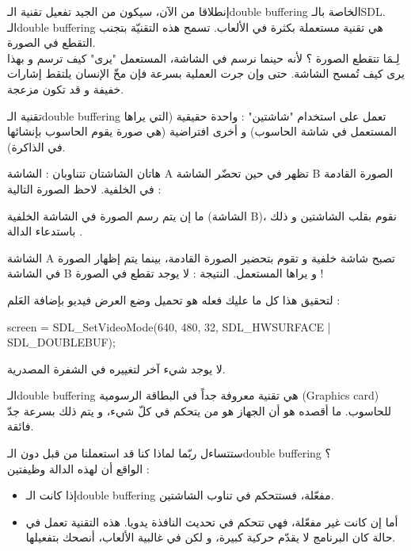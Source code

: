إنطلاقا من الآن، سيكون من الجيد تفعيل تقنية الـ\textenglish{double buffering}
الخاصة بالـ\textenglish{SDL}.
الـ\textenglish{double buffering}
هي تقنية مستعملة بكثرة في الألعاب. تسمح هذه التقنيّة بتجنب التقطع في الصورة.\\
لِـمَا تتقطع الصورة ؟ لأنه حينما نرسم في الشاشة، المستعمل "يرى" كيف ترسم و بهذا يرى كيف تُمسح الشاشة. حتى وإن جرت العملية بسرعة فإن مخّ الإنسان يلتقط إشارات خفيفة و قد تكون مزعجة.

تقنية الـ\textenglish{double buffering}
تعمل على استخدام "شاشتين" : واحدة حقيقية (التي يراها المستعمل في شاشة الحاسوب) و أخرى افتراضية (هي صورة يقوم الحاسوب بإنشائها في الذاكرة).

هاتان الشاشتان تتناوبان : الشاشة
\textenglish{A}
تظهر في حين تحضّر الشاشة
\textenglish{B}
الصورة القادمة في  الخلفية. لاحظ الصورة التالية :


ما إن يتم رسم الصورة في الشاشة الخلفية (الشاشة 
\textenglish{B})،
نقوم بقلب الشاشتين و ذلك باستدعاء الدالة
.


الشاشة
\textenglish{A}
تصبح شاشة خلفية و تقوم بتحضير الصورة القادمة، بينما يتم إظهار الصورة في الشاشة
\textenglish{B}
و يراها المستعمل. النتيجة : لا يوجد تقطع في الصورة !

لتحقيق هذا كل ما عليك فعله هو تحميل وضع العرض فيديو بإضافة العَلم 
 :

\begin{Csource}
screen = SDL_SetVideoMode(640, 480, 32, SDL_HWSURFACE | SDL_DOUBLEBUF);
\end{Csource}

لا يوجد شيء آخر لتغييره في الشفرة المصدرية.

\begin{information}
 الـ\textenglish{double buffering}
هي تقنية معروفة جداً في البطاقة الرسومية
(\textenglish{Graphics card})
 للحاسوب. ما أقصده هو أن الجهاز هو من يتحكم في كلّ شيء، و يتم ذلك بسرعة جدّ فائقة.
\end{information}

ستتساءل ربّما لماذا كنا قد استعملنا
من قبل دون الـ\textenglish{double buffering} ؟\\
الواقع أن لهذه الدالة وظيفتين :

\begin{itemize}
	\item إذا كانت الـ\textenglish{double buffering}
	مفعّلة، فستتحكم في تناوب الشاشتين.
	\item أما إن كانت غير مفعّلة، فهي تتحكم في تحديث النافذة يدويا. هذه التقنية تعمل في حالة كان البرنامج لا يقدّم حركية كبيرة، و لكن في غالبية الألعاب، أنصحك بتفعيلها.
\end{itemize}

